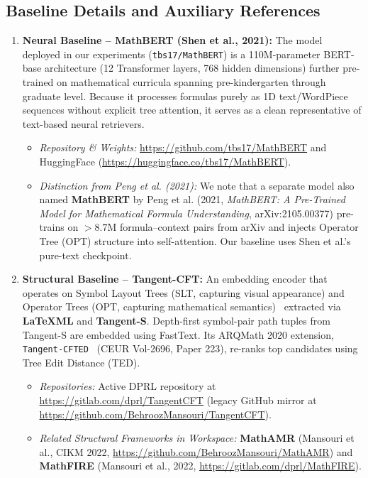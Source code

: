 ﻿\documentclass[11pt,a4paper]{article}
\begin{document}
	\subsection{Baseline Details and Auxiliary References}
	\begin{enumerate}
		\item \textbf{Neural Baseline -- MathBERT (Shen et al., 2021):} The model deployed in our experiments (\texttt{tbs17/MathBERT}) is a 110M-parameter BERT-base architecture (12 Transformer layers, 768 hidden dimensions) further pre-trained on mathematical curricula spanning pre-kindergarten through graduate level. Because it processes formulas purely as 1D text/WordPiece sequences without explicit tree attention, it serves as a clean representative of text-based neural retrievers.
		\begin{itemize}
			\item \textit{Repository \& Weights:} \url{https://github.com/tbs17/MathBERT} and HuggingFace (\url{https://huggingface.co/tbs17/MathBERT}).
			\item \textit{Distinction from Peng et al. (2021):} We note that a separate model also named \textbf{MathBERT} by Peng et al. (2021, \textit{MathBERT: A Pre-Trained Model for Mathematical Formula Understanding}, arXiv:2105.00377) pre-trains on $>8.7$M formula--context pairs from arXiv and injects Operator Tree (OPT) structure into self-attention. Our baseline uses Shen et al.'s pure-text checkpoint.
		\end{itemize}
		\item \textbf{Structural Baseline -- Tangent-CFT:} An embedding encoder that operates on Symbol Layout Trees (SLT, capturing visual appearance) and Operator Trees (OPT, capturing mathematical semantics)~\cite{mir_book2024} extracted via \textbf{LaTeXML} and \textbf{Tangent-S}. Depth-first symbol-pair path tuples from Tangent-S are embedded using FastText. Its ARQMath 2020 extension, \texttt{Tangent-CFTED}~\cite{tangentcfted2020} (CEUR Vol-2696, Paper 223), re-ranks top candidates using Tree Edit Distance (TED).
		\begin{itemize}
			\item \textit{Repositories:} Active DPRL repository at \url{https://gitlab.com/dprl/TangentCFT} (legacy GitHub mirror at \url{https://github.com/BehroozMansouri/TangentCFT}).
			\item \textit{Related Structural Frameworks in Workspace:} \textbf{MathAMR} (Mansouri et al., CIKM 2022, \url{https://github.com/BehroozMansouri/MathAMR}) and \textbf{MathFIRE} (Mansouri et al., 2022, \url{https://gitlab.com/dprl/MathFIRE}).

\end{itemize}
\end{enumerate}
\end{document}
